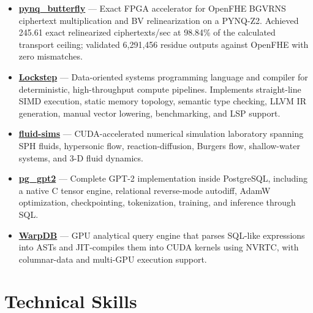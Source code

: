 \documentclass[10pt,letterpaper]{article}
\newcommand{\project}[2]{%
    \textbf{#1} --- #2
}
\begin{document}
\begin{itemize}

    \item
    \project{\href{https://github.com/seanwevans/pynq_butterfly}
    {pynq\_butterfly}}
    {Exact FPGA accelerator for OpenFHE BGVRNS ciphertext multiplication and BV
    relinearization on a PYNQ-Z2. Achieved 245.61 exact relinearized
    ciphertexts/sec at 98.84\% of the calculated transport ceiling; validated
    6,291,456 residue outputs against OpenFHE with zero mismatches.}

    \item
    \project{\href{https://github.com/seanwevans/lockstep}{Lockstep}}
    {Data-oriented systems programming language and compiler for deterministic,
    high-throughput compute pipelines. Implements straight-line SIMD execution,
    static memory topology, semantic type checking, LLVM IR generation, manual
    vector lowering, benchmarking, and LSP support.}

    \item
    \project{\href{https://github.com/seanwevans/fluid-sims}{fluid-sims}}
    {CUDA-accelerated numerical simulation laboratory spanning SPH fluids,
    hypersonic flow, reaction-diffusion, Burgers flow, shallow-water systems,
    and 3-D fluid dynamics.}

    \item
    \project{\href{https://github.com/seanwevans/pg_gpt2}{pg\_gpt2}}
    {Complete GPT-2 implementation inside PostgreSQL, including a native C tensor
    engine, relational reverse-mode autodiff, AdamW optimization, checkpointing,
    tokenization, training, and inference through SQL.}

    \item
    \project{\href{https://github.com/seanwevans/WarpDB}{WarpDB}}
    {GPU analytical query engine that parses SQL-like expressions into ASTs and
    JIT-compiles them into CUDA kernels using NVRTC, with columnar-data and
    multi-GPU execution support.}

\end{itemize}

\section*{Technical Skills}
\end{document}
